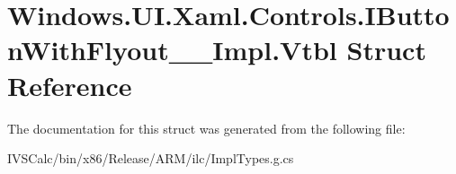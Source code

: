 \hypertarget{struct_windows_1_1_u_i_1_1_xaml_1_1_controls_1_1_i_button_with_flyout_____impl_1_1_vtbl}{}\section{Windows.\+U\+I.\+Xaml.\+Controls.\+I\+Button\+With\+Flyout\+\_\+\+\_\+\+Impl.\+Vtbl Struct Reference}
\label{struct_windows_1_1_u_i_1_1_xaml_1_1_controls_1_1_i_button_with_flyout_____impl_1_1_vtbl}


The documentation for this struct was generated from the following file\+:\begin{DoxyCompactItemize}
\item 
I\+V\+S\+Calc/bin/x86/\+Release/\+A\+R\+M/ilc/Impl\+Types.\+g.\+cs\end{DoxyCompactItemize}
